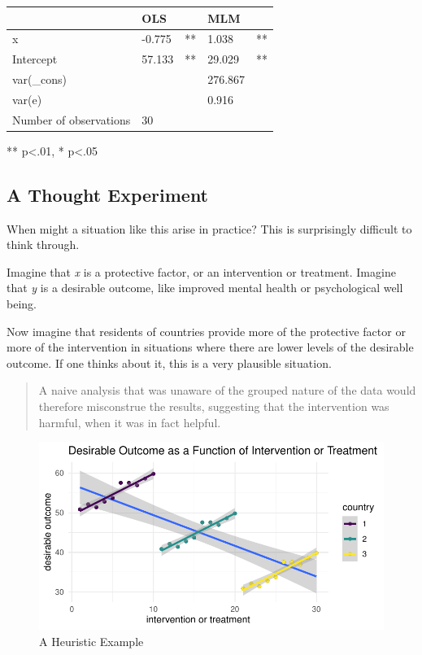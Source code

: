 \documentclass[
  letterpaper,
  DIV=11,
  numbers=noendperiod]{scrreprt}
\begin{document}
\begin{longtable}[]{@{}lllll@{}}
\toprule\noalign{}
& OLS & & MLM & \\
\midrule\noalign{}
\endhead
\bottomrule\noalign{}
\endlastfoot
x & -0.775 & ** & 1.038 & ** \\
Intercept & 57.133 & ** & 29.029 & ** \\
var(\_cons) & & & 276.867 & \\
var(e) & & & 0.916 & \\
Number of observations & 30 & & & \\
\end{longtable}

** p\textless.01, * p\textless.05

\subsection{A Thought Experiment}\label{a-thought-experiment}

When might a situation like this arise in practice? This is surprisingly
difficult to think through.

Imagine that \emph{x} is a protective factor, or an intervention or
treatment. Imagine that \emph{y} is a desirable outcome, like improved
mental health or psychological well being.

Now imagine that residents of countries provide more of the protective
factor or more of the intervention in situations where there are lower
levels of the desirable outcome. If one thinks about it, this is a very
plausible situation.

\begin{quote}
A naive analysis that was unaware of the grouped nature of the data
would therefore misconstrue the results, suggesting that the
intervention was harmful, when it was in fact helpful.
\end{quote}

\begin{figure}[H]

{\centering \includegraphics{cross-sectional_files/figure-pdf/unnamed-chunk-9-1.pdf}

}

\caption{A Heuristic Example}

\end{figure}%
\end{document}
